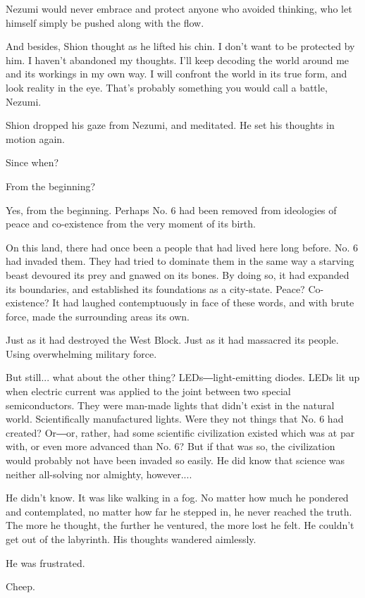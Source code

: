 Nezumi would never embrace and protect anyone who avoided thinking, who
let himself simply be pushed along with the flow.

And besides, Shion thought as he lifted his chin. I don't want to be
protected by him. I haven't abandoned my thoughts. I'll keep decoding
the world around me and its workings in my own way. I will confront the
world in its true form, and look reality in the eye. That's probably
something you would call a battle, Nezumi.

Shion dropped his gaze from Nezumi, and meditated. He set his thoughts
in motion again.

Since when?

From the beginning?

Yes, from the beginning. Perhaps No. 6 had been removed from ideologies
of peace and co-existence from the very moment of its birth.

On this land, there had once been a people that had lived here long
before. No. 6 had invaded them. They had tried to dominate them in the
same way a starving beast devoured its prey and gnawed on its bones. By
doing so, it had expanded its boundaries, and established its
foundations as a city-state. Peace? Co-existence? It had laughed
contemptuously in face of these words, and with brute force, made the
surrounding areas its own.

Just as it had destroyed the West Block. Just as it had massacred its
people. Using overwhelming military force.

But still... what about the other thing? LEDs―light-emitting diodes.
LEDs lit up when electric current was applied to the joint between two
special semiconductors. They were man-made lights that didn't exist in
the natural world. Scientifically manufactured lights. Were they not
things that No. 6 had created? Or―or, rather, had some scientific
civilization existed which was at par with, or even more advanced than
No. 6? But if that was so, the civilization would probably not have been
invaded so easily. He did know that science was neither all-solving nor
almighty, however....

He didn't know. It was like walking in a fog. No matter how much he
pondered and contemplated, no matter how far he stepped in, he never
reached the truth. The more he thought, the further he ventured, the
more lost he felt. He couldn't get out of the labyrinth. His thoughts
wandered aimlessly.

He was frustrated.

Cheep.

